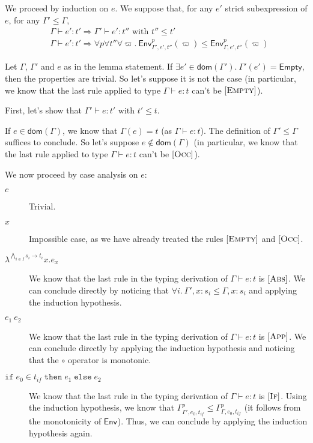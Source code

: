 \documentclass[a4paper]{article}%
\newcommand{\dom}[1]{\textsf{dom}(#1)}
\newcommand{\Empty} {\textsf{Empty}}%
\newcommand{\ite}[4]{\ensuremath{\texttt{if}\;#1\in#2\;\texttt{then}\;#3\;\texttt{else}\;#4}}
\newcommand{\Gp}[2]{\textsf{Env}^{#1}_{#2}}
\theoremstyle{definition}
\newcommand {\Rule}[1] {[\textsc{#1}]}
\begin{document}
    We proceed by induction on $e$. We suppose that, for any $e'$ strict subexpression of $e$, for any $\Gamma' \leq \Gamma$,
    \begin{align*}
      &\Gamma \vdash e':t' \Rightarrow \Gamma' \vdash e':t'' \text{ with } t'' \leq t'\\
      &\Gamma \vdash e':t' \Rightarrow \forall p \forall t'' \forall \varpi.\ \Gp p {\Gamma',e',t''} (\varpi) \leq \Gp p {\Gamma,e',t''} (\varpi)
    \end{align*}

    Let $\Gamma$, $\Gamma'$ and $e$ as in the lemma statement.
    If $\exists e' \in \dom {\Gamma'}.\ \Gamma'(e') = \Empty$, then the properties are trivial.
    So let's suppose it is not the case (in particular, we know that the last rule applied to type $\Gamma \vdash e:t$ can't be $\Rule{Empty}$).

    First, let's show that $\Gamma' \vdash e:t' \text{ with } t' \leq t$.

    If $e\in\dom\Gamma$, we know that $\Gamma(e)=t$ (as $\Gamma \vdash e:t$). The definition of $\Gamma' \leq \Gamma$ suffices to conclude.
    So let's suppose $e\not\in\dom\Gamma$ (in particular, we know that the last rule applied to type $\Gamma \vdash e:t$ can't be $\Rule{Occ}$).

    We now proceed by case analysis on $e$:
    \begin{description}
      \item[$c$] Trivial.
      \item[$x$] Impossible case, as we have already treated the rules $\Rule{Empty}$ and $\Rule{Occ}$.
      \item[$\lambda^{\bigwedge_{i\in I} s_i \rightarrow t_i}x.e_x$] We know that the last rule in the typing derivation of $\Gamma \vdash e:t$ is $\Rule {Abs}$.
      We can conclude directly by noticing that $\forall i.\ \Gamma',x:s_i \leq \Gamma,x:s_i$ and applying the induction hypothesis.
      \item[$e_1\ e_2$] We know that the last rule in the typing derivation of $\Gamma \vdash e:t$ is $\Rule {App}$.
      We can conclude directly by applying the induction hypothesis and noticing that the $\circ$ operator is monotonic.
      \item[$\ite {e_0} {t_{if}} {e_1} {e_2}$] We know that the last rule in the typing derivation of $\Gamma \vdash e:t$ is $\Rule {If}$.
      Using the induction hypothesis, we know that $\Gamma^p_{\Gamma',e_0,t_{if}} \leq \Gamma^p_{\Gamma,e_0,t_{if}}$ (it follows from the monotonicity of $\Gp {} {}$).
      Thus, we can conclude by applying the induction hypothesis again.\\
    \end{description}
\end{document}
